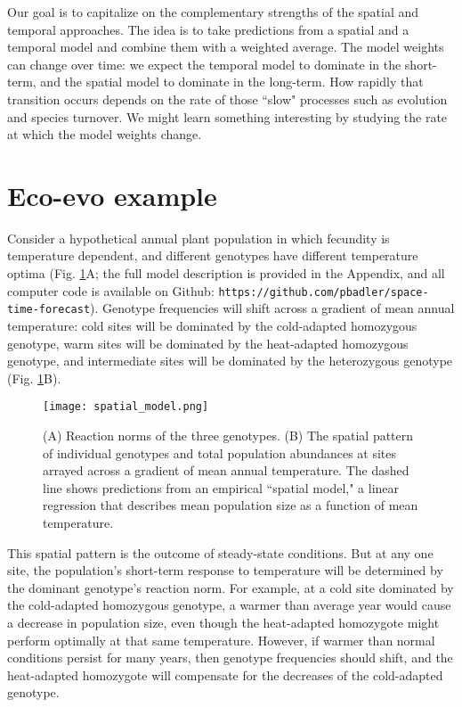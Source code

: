 \documentclass[11pt]{article}
\begin{document}
Our goal is to capitalize on the complementary strengths of the spatial and temporal approaches. The idea is to take predictions from a spatial and a temporal model and combine them with a weighted average. The model weights can change over time: we expect the temporal model to dominate in the short-term, and the spatial model to dominate in the long-term. How rapidly that transition occurs depends on the rate of those ``slow" processes such as evolution and species turnover. We might learn something interesting by studying the rate at which the model weights change.

\section*{Eco-evo example}

Consider a hypothetical annual plant population in which fecundity is temperature dependent, and different genotypes have different temperature optima (Fig. \ref{fig:spatial_model}A; the full model description is provided in the Appendix, and all computer code is available on Github: \texttt{https://github.com/pbadler/space-time-forecast}). Genotype frequencies will shift across a gradient of mean annual temperature: cold sites will be dominated by the cold-adapted homozygous genotype, warm sites will be dominated by the heat-adapted homozygous genotype, and intermediate sites will be dominated by the heterozygous genotype (Fig. \ref{fig:spatial_model}B).

\begin{figure}[tbp]
\centering
\texttt{[image: spatial\_model.png]}
\caption{(A) Reaction norms of the three genotypes. (B) The spatial pattern of individual genotypes and total population abundances at sites arrayed across a gradient of mean annual temperature. The dashed line shows predictions from an empirical ``spatial model," a linear regression that describes mean population size as a function of mean temperature. }
\label{fig:spatial_model}
\end{figure}

This spatial pattern is the outcome of steady-state conditions. But at any one site, the population's short-term response to temperature will be determined by the dominant genotype's reaction norm. For example, at a cold site dominated by the cold-adapted homozygous genotype, a warmer than average year would cause a decrease in population size, even though the heat-adapted homozygote might perform optimally at that same temperature. However, if warmer than normal conditions persist for many years, then genotype frequencies should shift, and the heat-adapted homozygote will compensate for the decreases of the cold-adapted genotype. 
\end{document}
